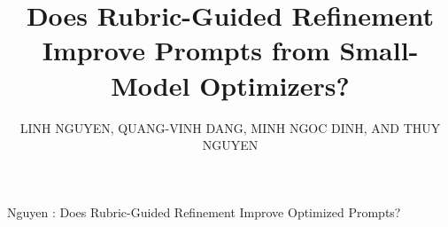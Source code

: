 \documentclass{ieeeaccess}
\begin{document}
\renewcommand{\thesection}{\arabic{section}}
\renewcommand{\thesubsection}{\thesection.\arabic{subsection}}
\renewcommand{\thesubsubsection}{\thesubsection.\arabic{subsubsection}}
\def\thesectiondis{\thesection.}
\def\thesubsectiondis{\thesection.\arabic{subsection}}
\def\thesubsubsectiondis{\thesection.\arabic{subsection}.\arabic{subsubsection}}


\title{Does Rubric-Guided Refinement Improve Prompts from Small-Model Optimizers?}

\author{\uppercase{Linh Nguyen}, \uppercase{Quang-Vinh Dang}, \uppercase{Minh Ngoc Dinh}, AND \uppercase{Thuy Nguyen}}

\address[1]{School of Science, Engineering \& Technology, RMIT University Vietnam, 702 Nguyen Van Linh Boulevard, Ho Chi Minh City 700000, Vietnam}
\address[2]{British University Vietnam, Hung Yen, Vietnam}
\address[3]{Millenia Education, Ho Chi Minh City, Vietnam}



{Nguyen \headeretal: Does Rubric-Guided Refinement Improve Optimized Prompts?}
\end{document}
